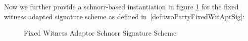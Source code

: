 Now we further provide a schnorr-based instantiation in figure \ref{fig:aptSchnorr} for the fixed witness adapted signature scheme as defined in~\ref{def:twoPartyFixedWitAptSig}:

\begin{figure}
    \begin{center}
        \fbox{
            \begin{varwidth}{\textwidth}
                \procedure[linenumbering, syntaxhighlight=auto]{$\procSetupApt{\varSecParam}$} {
                    (\varNonce \opSeperate \varRand) \opFunResult \procSetupPartSig{\varSecParam} \\
                    \varWit \sample \cnstIntegersPrimeWithoutZero{\varPrime} \\
                    \varStatement \opAssign \funGen{\varWit} \\
                    \pcreturn ((\varNonce \opSeperate \varRand)\opSeperate (\varWit, \varStatement))
                }
                \procedure[linenumbering, syntaxhighlight=auto]{$\procGenPtAptSig{\varMsg}{\varSecKeyAlice}{\varNonceAlice}{\varPubKeyBob}{\varRandBob}{\varWit}$}{
                    \varSigBob \opFunResult \procGenPartSig{\varMsg}{\varSecKeyAlice}{\varNonceAlice}{\varPubKeyBob}{\varRandBob} \\
                    \varS \opAssign \opAccess{\varSigBob}{\varS} \opAddScalar \varWit \\
                    \pcreturn \varSigAptAlice \opAssign (\varS \opSeperate \varStatement)
                } \\
                \procedure[linenumbering, syntaxhighlight=auto]{$\procVrfApt{\varMsg}{\varSecKeyAlice}{\varNonceAlice}{\varPubKeyBob}{\varRandBob}{\varStatement}{\varSigAptBob}$} {
                    \varSchnorrChallenge \opAssign \funHash{\varMsg \opConc \varPubKeyAlice \opAddPoint \varPubKeyBob \opConc \varRandAlice \opAddPoint \varRandBob} \\
                    \pcreturn \funGen{\varSigAptBob} \opEq \opPointScalar{\varRandBob}{\varSchnorrChallenge} \opAddPoint \varPubKeyBob \opAddPoint \funGen{\varWit}
                }
                \procedure[linenumbering, syntaxhighlight=auto]{$\procFinAptSig{\varSigAlice}{\varSigAptBob}{\varRandAlice}{\varRandBob}{\varWit}$}{
                    \varSigBob \opAssign \varSigAptBob \opSub \varWit \\
                    \pcreturn \procFinSig{\varSigAlice}{\varSigAptBob}{\varRandAlice}{\varRandBob}
                } \\
                \procedure[linenumbering, syntaxhighlight=auto]{$\procExtWit{\varSigFin}{\varSigAlice}{\varSigAptBob}$}{
                    \varSigBob \opAssign \varSigFin \opSub \varSigAlice \\
                    \varWit \opAssign \varSigAptBob \opSub \varSigBob \\
                    \pcreturn (\varWit)
                }
            \end{varwidth}
        }
    \end{center}
    \caption{Fixed Witness Adaptor Schnorr Signature Scheme}
    \label{fig:aptSchnorr}
\end{figure}

